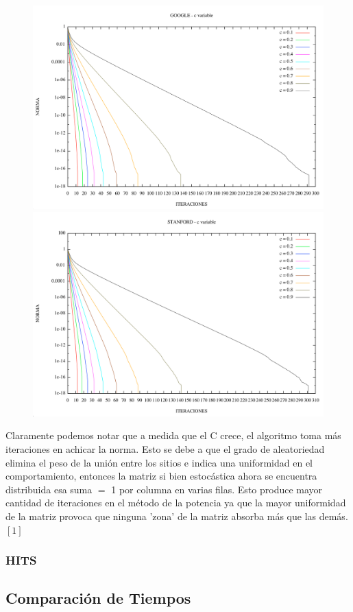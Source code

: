 \begin{figure}
\begin{center}
    \includegraphics[scale=0.5]{imagenes/pagerank_google_norma.png}
  \includegraphics[scale=0.5]{imagenes/pagerank_stanford_norma.png}
    \end{center}
\end{figure}

\FloatBarrier

Claramente podemos notar que a medida que el C crece, el algoritmo toma más iteraciones en achicar la norma. Esto se debe a que el grado de aleatoriedad elimina el peso de la unión entre los sitios e indica una uniformidad en el comportamiento, entonces la matriz si bien estocástica ahora se encuentra distribuida esa suma $=$ 1 por columna en varias filas. Esto produce mayor cantidad de iteraciones en el método de la potencia ya que la mayor uniformidad de la matriz provoca que ninguna 'zona' de la matriz absorba más que las demás.   $[1]$


\subsubsection {HITS}
\subsection{Comparación de Tiempos}
 
